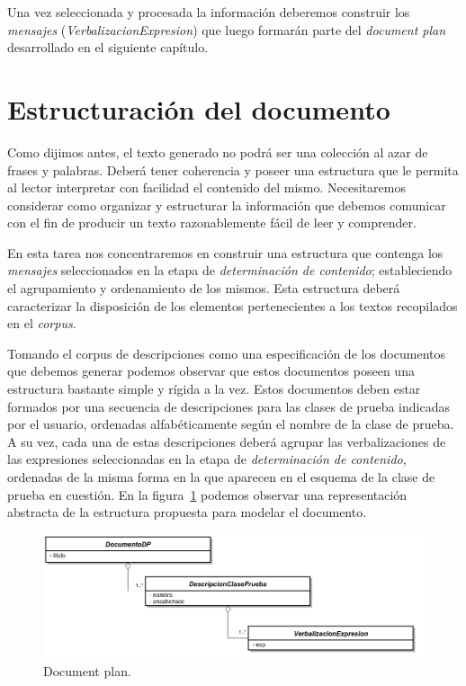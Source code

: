 \bigskip
Una vez seleccionada y procesada la información deberemos construir los \emph{mensajes} (\emph{VerbalizacionExpresion}) que luego formarán parte del \emph{document plan} desarrollado en el siguiente capítulo.

\section{Estructuración del documento}

Como dijimos antes, el texto generado no podrá ser una colección al azar de frases y palabras. Deberá tener coherencia y poseer una estructura que le permita al lector interpretar con facilidad el contenido del mismo.
Necesitaremos considerar como organizar y estructurar la información que debemos comunicar con el fin de producir un texto razonablemente fácil de leer y comprender.

En esta tarea nos concentraremos en construir una estructura que contenga los \emph{mensajes} seleccionados en la etapa de \emph{determinación de contenido}; estableciendo el agrupamiento y ordenamiento de los mismos. Esta estructura deberá caracterizar la disposición de los elementos pertenecientes a los textos recopilados en el \emph{corpus}. 

Tomando el corpus de descripciones como una especificación de los documentos que debemos generar podemos observar que estos documentos poseen una estructura bastante simple y rígida a la vez. Estos documentos deben estar formados por una secuencia de descripciones para las clases de prueba indicadas por el usuario, ordenadas alfabéticamente según el nombre de la clase de prueba. A su vez, cada una de estas descripciones deberá agrupar las verbalizaciones de las expresiones seleccionadas en la etapa de \emph{determinación de contenido}, ordenadas de la misma forma en la que aparecen en el esquema de la clase de prueba en cuestión. En la figura~\ref{fig:png_document_plan} podemos observar una representación abstracta de la estructura propuesta para modelar el documento.

\begin{figure}[H]
  	\centering
	\includegraphics[scale=0.4]{img/document_plan.png}
	\caption{Document plan.}
  	\label{fig:png_document_plan}
\end{figure}

